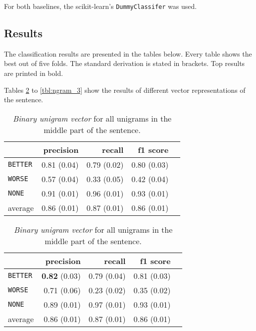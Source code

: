 For both baselines, the scikit-learn's \texttt{DummyClassifer} was used.



\subsection{Results}
The classification results are presented in the tables below. Every table shows the best out of five folds. The standard derivation is stated in brackets. Top results are printed in bold.

Tables \ref{tbl:se3} to \ref{tbl:ngram_3} show the results of different vector representations of the sentence. 


\begin{table}[!htb]
    \begin{minipage}{.5\linewidth}
    
        \caption{\emph{Sentence embeddings on the middle part of the sentence}. (Standard derivation)} 
        \label{tbl:se3}
        \begin{tabular}{@{}lrrrr@{}}
\toprule
 	&	 precision &	 recall &	 f1 score  \\ \midrule 
\texttt{BETTER}	&	 0.81 \scriptsize{(0.04)} &	 0.79 \scriptsize{(0.02)} &	 0.80 \scriptsize{(0.03)}  \\ 
\texttt{WORSE}	&	 0.57 \scriptsize{(0.04)} &	 0.33 \scriptsize{(0.05)} &	 0.42 \scriptsize{(0.04)}  \\ 
\texttt{NONE}	&	 0.91 \scriptsize{(0.01)} &	 0.96 \scriptsize{(0.01)} &	 0.93 \scriptsize{(0.01)}  \\ 
average	&	 0.86 \scriptsize{(0.01)} &	 0.87 \scriptsize{(0.01)} &	 0.86 \scriptsize{(0.01)}  \\ 
\bottomrule
        \end{tabular} 
  \end{minipage} \hfill
    \begin{minipage}{.5\linewidth}
    \caption{ \emph{Binary unigram vector} for all unigrams in the middle part of the sentence. } 
          \begin{tabular}{@{}lrrrr@{}}
\toprule
 	&	 precision &	 recall &	 f1 score  \\ \midrule 
\texttt{BETTER}	&	 \textbf{0.82} \scriptsize{(0.03)} &	 0.79 \scriptsize{(0.04)} &	 0.81 \scriptsize{(0.03)}  \\ 
\texttt{WORSE}	&	 0.71 \scriptsize{(0.06)} &	 0.23 \scriptsize{(0.02)} &	 0.35 \scriptsize{(0.02)}  \\ 
\texttt{NONE}	&	 0.89 \scriptsize{(0.01)} &	 0.97 \scriptsize{(0.01)} &	 0.93 \scriptsize{(0.01)}  \\ 
average	&	 0.86 \scriptsize{(0.01)} &	 0.87 \scriptsize{(0.01)} &	 0.86 \scriptsize{(0.01)}  \\ 
\bottomrule
            \end{tabular}
    \end{minipage} 
\end{table}





